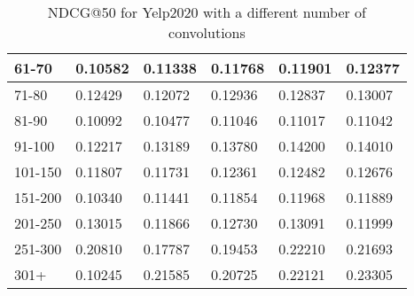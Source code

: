 \begin{table*}[]
\begin{tabular}{|l|l|l|l|l|l|}
    61-70   & 0.10582                    & 0.11338                    & 0.11768                    & 0.11901                    & 0.12377                           \\ \hline
    71-80   & 0.12429                    & 0.12072                    & 0.12936                    & 0.12837                    & 0.13007                           \\ \hline
    81-90   & 0.10092                    & 0.10477                    & 0.11046                    & 0.11017                    & 0.11042                           \\ \hline
    91-100  & 0.12217                    & 0.13189                    & 0.13780                    & 0.14200                    & 0.14010                           \\ \hline
    101-150 & 0.11807                    & 0.11731                    & 0.12361                    & 0.12482                    & 0.12676                           \\ \hline
    151-200 & 0.10340                    & 0.11441                    & 0.11854                    & 0.11968                    & 0.11889                           \\ \hline
    201-250 & 0.13015                    & 0.11866                    & 0.12730                    & 0.13091                    & 0.11999                           \\ \hline
    251-300 & 0.20810                    & 0.17787                    & 0.19453                    & 0.22210                    & 0.21693                           \\ \hline
    301+    & 0.10245                    & 0.21585                    & 0.20725                    & 0.22121                    & 0.23305                           \\ \hline
    \end{tabular}
    \caption{NDCG@50 for Yelp2020 with a different number of convolutions}
    \label{tab:yelp2020-con-evaluation}
\end{table*}

